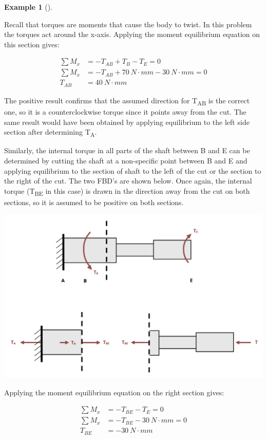 \documentclass[
  letterpaper,
  DIV=11,
  numbers=noendperiod]{scrreprt}
\theoremstyle{definition}
\newtheorem{example}{Example}[chapter]
\theoremstyle{remark}
\begin{document}
\begin{tcolorbox}
\begin{example}[]
\begin{tcolorbox}
Recall that torques are moments that cause the body to twist. In this
problem the torques act around the x-axis. Applying the moment
equilibrium equation on this section gives:

\[
\begin{aligned}
\sum M_x&=-T_{AB}+T_B-T_E=0 \\
\sum M_x&=-T_{A B}+70{~N}\cdot{mm}-30{~N}\cdot{mm}=0 \\
T_{A B}&=40{~N}\cdot{mm}
\end{aligned}
\]

The positive result confirms that the assumed direction for
T\textsubscript{AB} is the correct one, so it is a counterclockwise
torque since it points away from the cut. The same result would have
been obtained by applying equilibrium to the left side section after
determining T\textsubscript{A}.

Similarly, the internal torque in all parts of the shaft between B and E
can be determined by cutting the shaft at a non-specific point between B
and E and applying equilibrium to the section of shaft to the left of
the cut or the section to the right of the cut. The two FBD's are shown
below. Once again, the internal torque (T\textsubscript{BE} in this
case) is drawn in the direction away from the cut on both sections, so
it is assumed to be positive on both sections.

\begin{center}
\includegraphics{images/CH6 PNGs/example 6.1 part 3.png}
\end{center}

Applying the moment equilibrium equation on the right section gives:

\[
\begin{aligned}
\sum M_x&=-T_{BE}-T_E=0 \\
\sum M_x&=-T_{BE}-30{~}N\cdot{mm}=0 \\
T_{B E}&=-30{~N}\cdot{mm}
\end{aligned}
\]


\end{tcolorbox}
\end{example}
\end{tcolorbox}
\end{document}
